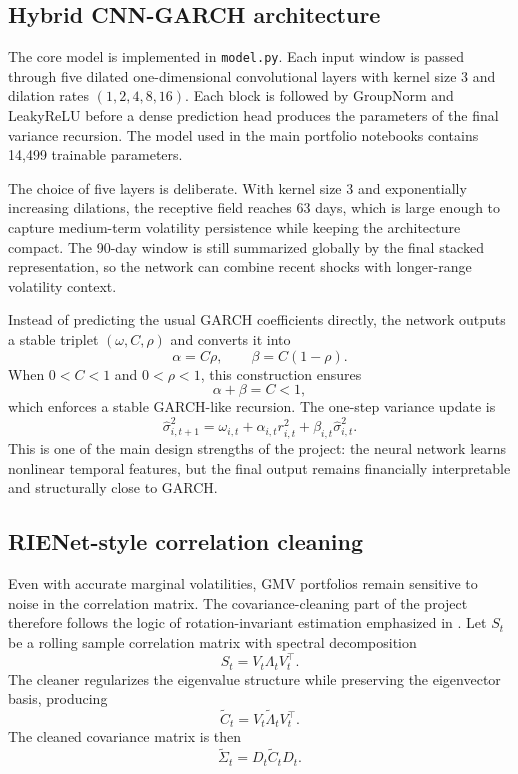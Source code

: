 \documentclass[11pt,a4paper]{article}
\begin{document}
\subsection{Hybrid CNN-GARCH architecture}

The core model is implemented in \texttt{model.py}. Each input window is passed through five dilated one-dimensional convolutional layers with kernel size 3 and dilation rates $(1,2,4,8,16)$. Each block is followed by GroupNorm and LeakyReLU before a dense prediction head produces the parameters of the final variance recursion. The model used in the main portfolio notebooks contains 14{,}499 trainable parameters.

The choice of five layers is deliberate. With kernel size 3 and exponentially increasing dilations, the receptive field reaches 63 days, which is large enough to capture medium-term volatility persistence while keeping the architecture compact. The 90-day window is still summarized globally by the final stacked representation, so the network can combine recent shocks with longer-range volatility context.

Instead of predicting the usual GARCH coefficients directly, the network outputs a stable triplet $(\omega, C, \rho)$ and converts it into
\[
\alpha = C\rho, \qquad \beta = C(1-\rho).
\]
When $0 < C < 1$ and $0 < \rho < 1$, this construction ensures
\[
\alpha + \beta = C < 1,
\]
which enforces a stable GARCH-like recursion. The one-step variance update is
\[
\hat{\sigma}_{i,t+1}^2
=
\omega_{i,t}
+
\alpha_{i,t} r_{i,t}^2
+
\beta_{i,t}\hat{\sigma}_{i,t}^2.
\]
This is one of the main design strengths of the project: the neural network learns nonlinear temporal features, but the final output remains financially interpretable and structurally close to GARCH.

\subsection{RIENet-style correlation cleaning}

Even with accurate marginal volatilities, GMV portfolios remain sensitive to noise in the correlation matrix. The covariance-cleaning part of the project therefore follows the logic of rotation-invariant estimation emphasized in \cite{ledoit2004,bongiorno2025e2e}. Let $S_t$ be a rolling sample correlation matrix with spectral decomposition
\[
S_t = V_t \Lambda_t V_t^\top.
\]
The cleaner regularizes the eigenvalue structure while preserving the eigenvector basis, producing
\[
\widetilde{C}_t = V_t \widetilde{\Lambda}_t V_t^\top.
\]
The cleaned covariance matrix is then
\[
\widetilde{\Sigma}_t = D_t \widetilde{C}_t D_t.
\]
\end{document}

